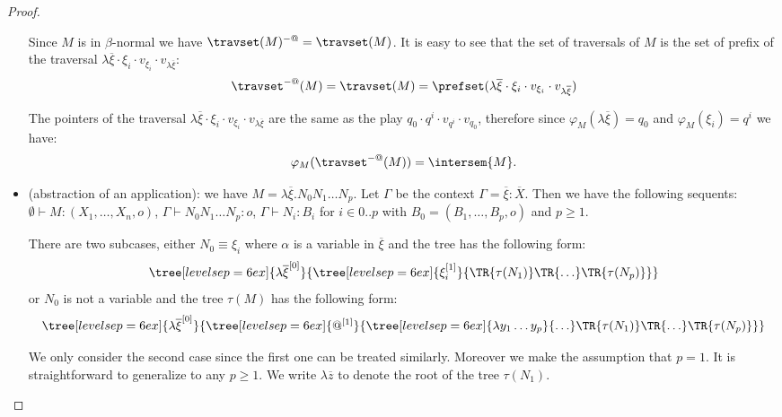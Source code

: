 \begin{proof}
\begin{itemize}
        Since $M$ is in $\beta$-normal we have $\travset(M)^{-@} = \travset(M)$.
        It is easy to see that the set of traversals of $M$ is the set of prefix of
        the traversal $\lambda \overline{\xi} \cdot \xi_i \cdot v_{\xi_i} \cdot v_{\lambda \overline{\xi}}$:
        $$ \travset^{-@}(M) = \travset(M) = \prefset( \lambda \overline{\xi} \cdot \xi_i \cdot v_{\xi_i} \cdot v_{\lambda \overline{\xi}})
        $$

        The pointers of the traversal $\lambda \overline{\xi} \cdot \xi_i \cdot v_{\xi_i} \cdot
        v_{\lambda \overline{\xi}}$ are the same as the play $q_0 \cdot q^i \cdot v_{q^i} \cdot
        v_{q_0}$, therefore since $\varphi_M(\lambda \overline{\xi}) = q_0$ and $\varphi_M(\xi_i) =
        q^i$ we have:
        $$ \varphi_M(\travset^{-@}(M)) = \intersem{M}.$$


    \item (abstraction of an application): we have $M = \lambda \overline{\xi} . N_0 N_1 \ldots N_p$. Let $\Gamma$ be the context
    $\Gamma = \overline{\xi} : \overline{X}$. Then we have the following sequents:
    $\emptyset \vdash M : (X_1,\ldots,X_n,o)$,
    $\Gamma \vdash N_0 N_1 \ldots N_p : o$,
    $\Gamma \vdash N_i : B_i$ for $i\in 0..p$ with $B_0 = (B_1,\ldots,B_p,o)$ and $p\geq 1$.

    There are two subcases, either $N_0 \equiv \xi_i$ where $\alpha$ is a variable in $\overline{\xi}$ and the tree has the following form:
    $$ \tree[levelsep=6ex]{\lambda \overline{\xi}^{[0]}}
        { \tree[levelsep=6ex]{\xi_i^{[1]}}
            {   \TR{\tau(N_1)} \TR{\ldots} \TR{\tau(N_p)}}}
    $$
    or $N_0$ is not a variable and the tree $\tau(M)$ has the following form:
    $$ \tree[levelsep=6ex]{\lambda \overline{\xi}^{[0]}}
        { \tree[levelsep=6ex]{@^{[1]}}
            {
            \tree[levelsep=6ex]{\lambda y_1 \ldots y_p}{\ldots}
            \TR{\tau(N_1)} \TR{\ldots} \TR{\tau(N_p)}}}
    $$

    We only consider the second case since the first one can be treated
    similarly. Moreover we make the assumption that $p=1$. It is
    straightforward to generalize to any $p\geq1$.
    We write $\lambda \overline{z}$ to denote the root of the tree $\tau(N_1)$.



\end{itemize}
\end{proof}
